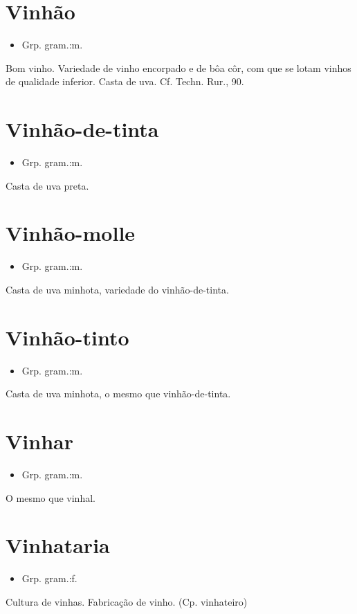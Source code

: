 \documentclass{article}
\begin{document}
\section{Vinhão}
\begin{itemize}
\item {Grp. gram.:m.}
\end{itemize}
Bom vinho.
Variedade de vinho encorpado e de bôa côr, com que se lotam vinhos de qualidade inferior.
Casta de uva. Cf. \textunderscore Techn. Rur.\textunderscore , 90.
\section{Vinhão-de-tinta}
\begin{itemize}
\item {Grp. gram.:m.}
\end{itemize}
Casta de uva preta.
\section{Vinhão-molle}
\begin{itemize}
\item {Grp. gram.:m.}
\end{itemize}
Casta de uva minhota, variedade do vinhão-de-tinta.
\section{Vinhão-tinto}
\begin{itemize}
\item {Grp. gram.:m.}
\end{itemize}
Casta de uva minhota, o mesmo que \textunderscore vinhão-de-tinta\textunderscore .
\section{Vinhar}
\begin{itemize}
\item {Grp. gram.:m.}
\end{itemize}
O mesmo que \textunderscore vinhal\textunderscore .
\section{Vinhataria}
\begin{itemize}
\item {Grp. gram.:f.}
\end{itemize}
Cultura de vinhas.
Fabricação de vinho.
(Cp. \textunderscore vinhateiro\textunderscore )
\end{document}
